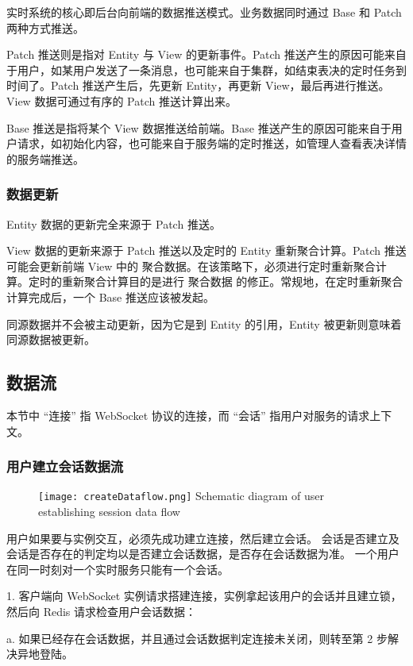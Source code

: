 实时系统的核心即后台向前端的数据推送模式。业务数据同时通过 Base 和 Patch 两种方式推送。

Patch 推送则是指对 Entity 与 View 的更新事件。Patch 推送产生的原因可能来自于用户，如某用户发送了一条消息，也可能来自于集群，如结束表决的定时任务到时间了。Patch 推送产生后，先更新 Entity，再更新 View，最后再进行推送。View 数据可通过有序的 Patch 推送计算出来。

Base 推送是指将某个 View 数据推送给前端。Base 推送产生的原因可能来自于用户请求，如初始化内容，也可能来自于服务端的定时推送，如管理人查看表决详情的服务端推送。

\subsubsection{数据更新}

Entity 数据的更新完全来源于 Patch 推送。

View 数据的更新来源于 Patch 推送以及定时的 Entity 重新聚合计算。Patch 推送可能会更新前端 View 中的 聚合数据。在该策略下，必须进行定时重新聚合计算。定时的重新聚合计算目的是进行 聚合数据 的修正。常规地，在定时重新聚合计算完成后，一个 Base 推送应该被发起。

同源数据并不会被主动更新，因为它是到 Entity 的引用，Entity 被更新则意味着同源数据被更新。

\subsection{数据流}
本节中 “连接” 指 WebSocket 协议的连接，而 “会话” 指用户对服务的请求上下文。
\subsubsection{用户建立会话数据流}
\begin{figure}[!htp]
  \centering
  \texttt{[image: createDataflow.png]}
    {Schematic diagram of user establishing session data flow}
 \label{fig:createDataflow}
\end{figure}
用户如果要与实例交互，必须先成功建立连接，然后建立会话。
会话是否建立及会话是否存在的判定均以是否建立会话数据，是否存在会话数据为准。
一个用户在同一时刻对一个实时服务只能有一个会话。

1. 客户端向 WebSocket 实例请求搭建连接，实例拿起该用户的会话并且建立锁，然后向 Redis 请求检查用户会话数据：

\quad{}a. 如果已经存在会话数据，并且通过会话数据判定连接未关闭，则转至第 2 步解决异地登陆。

